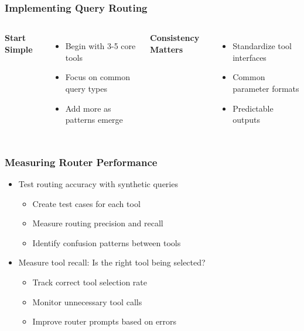 \begin{frame}
    \frametitle{Implementing Query Routing}
    \begin{columns}
        \textbf{Start Simple}
        \begin{itemize}
            \item Begin with 3-5 core tools
            \item Focus on common query types
            \item Add more as patterns emerge
        \end{itemize}
        
        \textbf{Consistency Matters}
        \begin{itemize}
            \item Standardize tool interfaces
            \item Common parameter formats
            \item Predictable outputs
        \end{itemize}
    \end{columns}
    
    \vspace{0.3cm}
    \begin{center}
    \end{center}
\end{frame}

\begin{frame}
    \frametitle{Measuring Router Performance}
    \begin{itemize}
        \item Test routing accuracy with synthetic queries
        \begin{itemize}
            \item Create test cases for each tool
            \item Measure routing precision and recall
            \item Identify confusion patterns between tools
        \end{itemize}
        \item Measure tool recall: Is the right tool being selected?
        \begin{itemize}
            \item Track correct tool selection rate
            \item Monitor unnecessary tool calls
            \item Improve router prompts based on errors
        \end{itemize}
    \end{itemize}
\end{frame}

